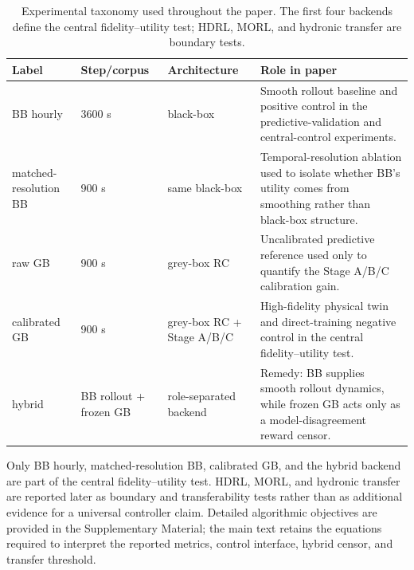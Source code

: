 \documentclass[a4paper,fleqn]{cas-sc}
\begin{document}
\begin{table}[pos={!ht}]
\centering
\caption{Experimental taxonomy used throughout the paper. The first four backends define the central fidelity--utility test; HDRL, MORL, and hydronic transfer are boundary tests.}
\label{tab:taxonomy}
\small
\begin{tabularx}{\linewidth}{@{}p{20mm}p{18mm}p{32mm}X@{}}
\toprule
Label & Step/corpus & Architecture & Role in paper \\
\midrule
BB hourly & 3600 s & black-box & Smooth rollout baseline and positive control in the predictive-validation and central-control experiments. \\
matched-resolution BB & 900 s & same black-box & Temporal-resolution ablation used to isolate whether BB's utility comes from smoothing rather than black-box structure. \\
raw GB & 900 s & grey-box RC & Uncalibrated predictive reference used only to quantify the Stage A/B/C calibration gain. \\
calibrated GB & 900 s & grey-box RC + Stage A/B/C & High-fidelity physical twin and direct-training negative control in the central fidelity--utility test. \\
hybrid & BB rollout + frozen GB & role-separated backend & Remedy: BB supplies smooth rollout dynamics, while frozen GB acts only as a model-disagreement reward censor. \\
\bottomrule
\end{tabularx}
\end{table}
\FloatBarrier

Only BB hourly, matched-resolution BB, calibrated GB, and the hybrid backend are part of the central fidelity--utility test. HDRL, MORL, and hydronic transfer are reported later as boundary and transferability tests rather than as additional evidence for a universal controller claim. Detailed algorithmic objectives are provided in the Supplementary Material; the main text retains the equations required to interpret the reported metrics, control interface, hybrid censor, and transfer threshold.
\end{document}
